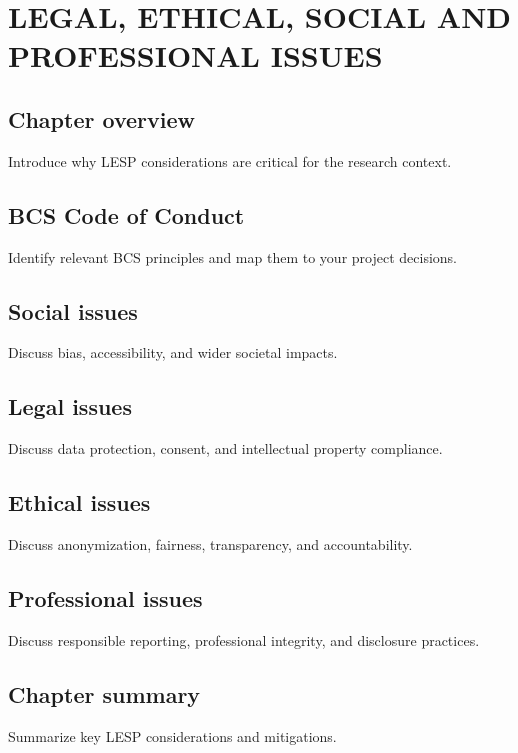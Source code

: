 \chapter{LEGAL, ETHICAL, SOCIAL AND PROFESSIONAL ISSUES}
\section{Chapter overview}
Introduce why LESP considerations are critical for the research context.

\section{BCS Code of Conduct}
Identify relevant BCS principles and map them to your project decisions.

\section{Social issues}
Discuss bias, accessibility, and wider societal impacts.

\section{Legal issues}
Discuss data protection, consent, and intellectual property compliance.

\section{Ethical issues}
Discuss anonymization, fairness, transparency, and accountability.

\section{Professional issues}
Discuss responsible reporting, professional integrity, and disclosure practices.

\section{Chapter summary}
Summarize key LESP considerations and mitigations.
